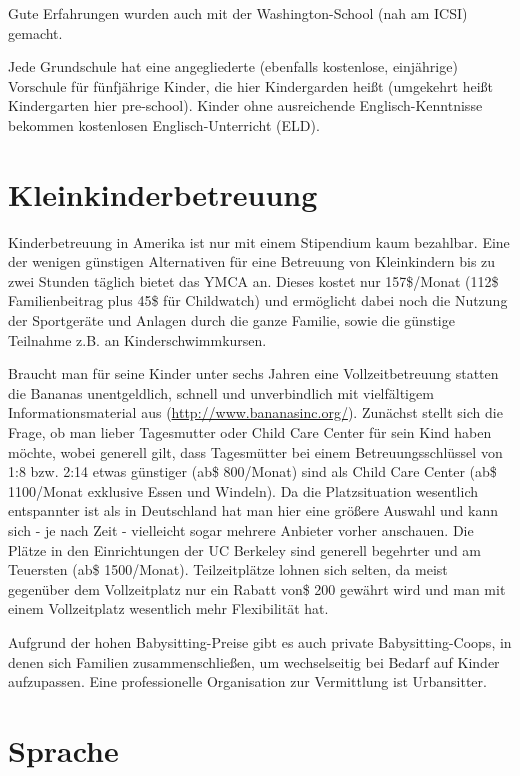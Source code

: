 \documentclass[a4paper]{scrreprt}
\begin{document}
Gute Erfahrungen wurden auch mit der Washington-School (nah am ICSI) gemacht.

Jede Grundschule hat eine angegliederte (ebenfalls kostenlose, einjährige) Vorschule für fünfjährige Kinder, die hier Kindergarden heißt (umgekehrt heißt Kindergarten hier pre-school). Kinder ohne ausreichende Englisch-Kenntnisse bekommen kostenlosen Englisch-Unterricht (ELD).

\section{Kleinkinderbetreuung}

Kinderbetreuung in Amerika ist nur mit einem Stipendium kaum bezahlbar. Eine der wenigen günstigen Alternativen für eine Betreuung von Kleinkindern bis zu zwei Stunden täglich bietet das YMCA an. Dieses kostet nur 157\$/Monat (112\$ Familienbeitrag plus 45\$ für Childwatch) und ermöglicht dabei noch die Nutzung der Sportgeräte und Anlagen durch die ganze Familie, sowie die günstige Teilnahme z.B. an Kinderschwimmkursen.

Braucht man für seine Kinder unter sechs Jahren eine Vollzeitbetreuung statten die Bananas unentgeldlich, schnell und unverbindlich mit vielfältigem Informationsmaterial aus (\url{http://www.bananasinc.org/}). Zunächst stellt sich die Frage, ob man lieber Tagesmutter oder Child Care Center für sein Kind haben möchte, wobei generell gilt, dass Tagesmütter bei einem Betreuungsschlüssel von 1:8 bzw. 2:14 etwas günstiger (ab\$ 800/Monat) sind als Child Care Center (ab\$ 1100/Monat exklusive Essen und Windeln). Da die Platzsituation wesentlich entspannter ist als in Deutschland hat man hier eine größere Auswahl und kann sich - je nach Zeit - vielleicht sogar mehrere Anbieter vorher anschauen. Die Plätze in den Einrichtungen der UC Berkeley sind generell begehrter und am Teuersten (ab\$ 1500/Monat). Teilzeitplätze lohnen sich selten, da meist gegenüber dem Vollzeitplatz nur ein Rabatt von\$ 200 gewährt wird und man mit einem Vollzeitplatz wesentlich mehr Flexibilität hat. 

Aufgrund der hohen Babysitting-Preise gibt es auch private Babysitting-Coops, in denen sich Familien zusammenschließen, um wechselseitig bei Bedarf auf Kinder aufzupassen.
Eine professionelle Organisation zur Vermittlung ist Urbansitter.

\section{Sprache}
\end{document}

